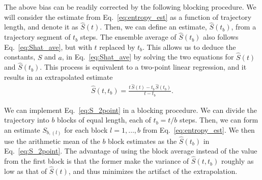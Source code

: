 \documentclass[reprint, superscriptaddress]{revtex4-1}
\begin{document}
The above bias can be readily corrected by the following blocking procedure.
%
We will consider the estimate from Eq.~\eqref{eq:entropy_est}
as a function of trajectory length, and denote it as $\hat S(t)$.
%
Then, we can define an estimate, $\hat S(t_b)$,
from a trajectory segment of $t_b$ steps.
%
The ensemble average of $\hat S(t_b)$ also follows
Eq.~\eqref{eq:Shat_ave}, but with $t$ replaced by $t_b$.
%
This allows us to deduce the constants, $S$ and $a$, in Eq.~\eqref{eq:Shat_ave}
by solving the two equations for $\hat S(t)$ and $\hat S(t_b)$.
%
This process is equivalent to a two-point linear regression,
and it results in an extrapolated estimate
%
\begin{align}
    \hat S(t, t_b)
    =
    \frac{ t \, \hat S(t) - t_b \, \hat S(t_b) }
         { t - t_b }
    .
    \label{eq:S_2point}
\end{align}

We can implement Eq.~\eqref{eq:S_2point} in a blocking procedure.
%
We can divide the trajectory into $b$ blocks of equal length,
each of $t_b = t/b$ steps.
%
Then, we can form an estimate $S_{b, (l)}$ for each block $l = 1, \dots, b$ from Eq.~\eqref{eq:entropy_est}.
%
We then use the arithmetic mean of the $b$ block estimates
as the $\hat S(t_b)$ in Eq.~\eqref{eq:S_2point}.
%
The advantage of using the block average instead of
the value from the first block is that
the former make the variance of $\hat S(t, t_b)$
roughly as low as that of $\hat S(t)$,
and thus minimizes the artifact of the extrapolation.


%
\end{document}
